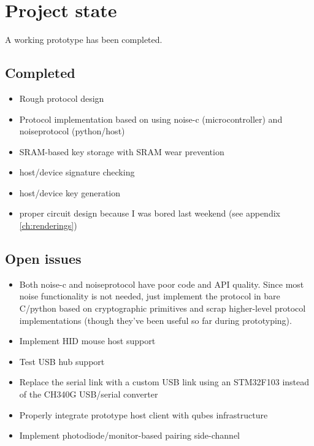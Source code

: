 \documentclass[12pt,a4paper,notitlepage]{article}
\begin{document}
\section{Project state}
A working prototype has been completed.

\subsection{Completed}
\begin{itemize}
    \item Rough protocol design
    \item Protocol implementation based on \textcite{perrin01} using noise-c (microcontroller) and noiseprotocol (python/host)
    \item SRAM-based key storage with SRAM wear prevention
    \item host/device signature checking
    \item host/device key generation
    \item proper circuit design because I was bored last weekend (see appendix \ref{ch:renderings})
\end{itemize}

\subsection{Open issues}
\begin{itemize}
    \item Both noise-c and noiseprotocol have poor code and API quality. Since most noise functionality is not needed,
        just implement the protocol in bare C/python based on cryptographic primitives and scrap higher-level protocol
        implementations (though they've been useful so far during prototyping).
    \item Implement HID mouse host support
    \item Test USB hub support
    \item Replace the serial link with a custom USB link using an STM32F103 instead of the CH340G USB/serial converter
    \item Properly integrate prototype host client with qubes infrastructure
    \item Implement photodiode/monitor-based pairing side-channel
\end{itemize}
\end{document}
